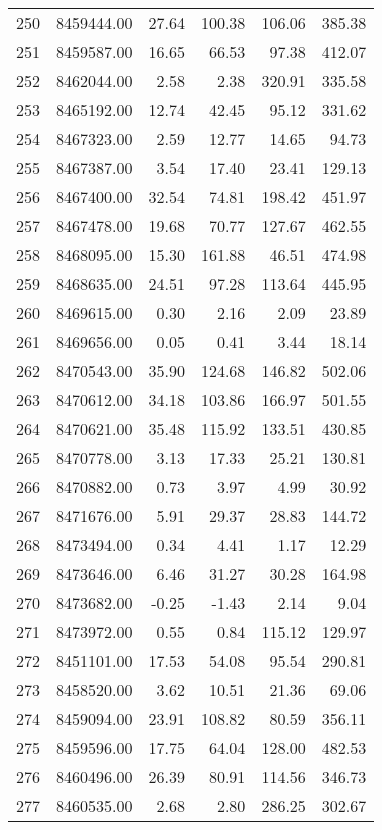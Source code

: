 \begin{table}[ht]
\begin{tabular}{rrrrrr}
  250 & 8459444.00 & 27.64 & 100.38 & 106.06 & 385.38 \\ 
  251 & 8459587.00 & 16.65 & 66.53 & 97.38 & 412.07 \\ 
  252 & 8462044.00 & 2.58 & 2.38 & 320.91 & 335.58 \\ 
  253 & 8465192.00 & 12.74 & 42.45 & 95.12 & 331.62 \\ 
  254 & 8467323.00 & 2.59 & 12.77 & 14.65 & 94.73 \\ 
  255 & 8467387.00 & 3.54 & 17.40 & 23.41 & 129.13 \\ 
  256 & 8467400.00 & 32.54 & 74.81 & 198.42 & 451.97 \\ 
  257 & 8467478.00 & 19.68 & 70.77 & 127.67 & 462.55 \\ 
  258 & 8468095.00 & 15.30 & 161.88 & 46.51 & 474.98 \\ 
  259 & 8468635.00 & 24.51 & 97.28 & 113.64 & 445.95 \\ 
  260 & 8469615.00 & 0.30 & 2.16 & 2.09 & 23.89 \\ 
  261 & 8469656.00 & 0.05 & 0.41 & 3.44 & 18.14 \\ 
  262 & 8470543.00 & 35.90 & 124.68 & 146.82 & 502.06 \\ 
  263 & 8470612.00 & 34.18 & 103.86 & 166.97 & 501.55 \\ 
  264 & 8470621.00 & 35.48 & 115.92 & 133.51 & 430.85 \\ 
  265 & 8470778.00 & 3.13 & 17.33 & 25.21 & 130.81 \\ 
  266 & 8470882.00 & 0.73 & 3.97 & 4.99 & 30.92 \\ 
  267 & 8471676.00 & 5.91 & 29.37 & 28.83 & 144.72 \\ 
  268 & 8473494.00 & 0.34 & 4.41 & 1.17 & 12.29 \\ 
  269 & 8473646.00 & 6.46 & 31.27 & 30.28 & 164.98 \\ 
  270 & 8473682.00 & -0.25 & -1.43 & 2.14 & 9.04 \\ 
  271 & 8473972.00 & 0.55 & 0.84 & 115.12 & 129.97 \\ 
  272 & 8451101.00 & 17.53 & 54.08 & 95.54 & 290.81 \\ 
  273 & 8458520.00 & 3.62 & 10.51 & 21.36 & 69.06 \\ 
  274 & 8459094.00 & 23.91 & 108.82 & 80.59 & 356.11 \\ 
  275 & 8459596.00 & 17.75 & 64.04 & 128.00 & 482.53 \\ 
  276 & 8460496.00 & 26.39 & 80.91 & 114.56 & 346.73 \\ 
  277 & 8460535.00 & 2.68 & 2.80 & 286.25 & 302.67 \\ 

\end{tabular}
\end{table}
